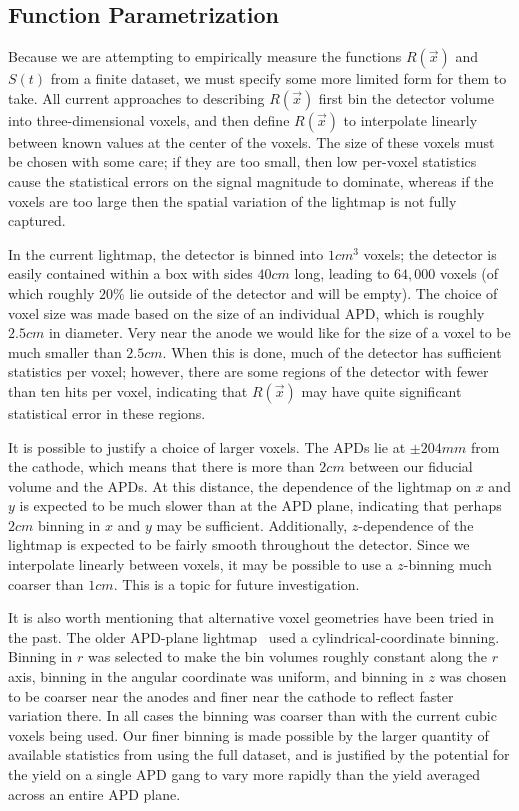 \subsection{Function Parametrization} \label{sec:LightmapFunctionParametrization}

Because we are attempting to empirically measure the functions $R(\vec{x})$ and $S(t)$ from a finite dataset, we must specify some more limited form for them to take.  All current approaches to describing $R(\vec{x})$ first bin the detector volume into three-dimensional voxels, and then define $R(\vec{x})$ to interpolate linearly between known values at the center of the voxels.  The size of these voxels must be chosen with some care; if they are too small, then low per-voxel statistics cause the statistical errors on the signal magnitude to dominate, whereas if the voxels are too large then the spatial variation of the lightmap is not fully captured.

In the current lightmap, the detector is binned into $1 cm^3$ voxels; the detector is easily contained within a box with sides $40 cm$ long, leading to $64,000$ voxels (of which roughly $20\%$ lie outside of the detector and will be empty).  The choice of voxel size was made based on the size of an individual APD, which is roughly $2.5 cm$ in diameter. Very near the anode we would like for the size of a voxel to be much smaller than $2.5 cm$.  When this is done, much of the detector has sufficient statistics per voxel; however, there are some regions of the detector with fewer than ten hits per voxel, indicating that $R(\vec{x})$ may have quite significant statistical error in these regions.

It is possible to justify a choice of larger voxels.  The APDs lie at $\pm 204 mm$ from the cathode, which means that there is more than $2 cm$ between our fiducial volume and the APDs.  At this distance, the dependence of the lightmap on $x$ and $y$ is expected to be much slower than at the APD plane, indicating that perhaps $2 cm$ binning in $x$ and $y$ may be sufficient.  Additionally, $z$-dependence of the lightmap is expected to be fairly smooth throughout the detector. Since we interpolate linearly between voxels, it may be possible to use a $z$-binning much coarser than $1 cm$.  This is a topic for future investigation.

It is also worth mentioning that alternative voxel geometries have been tried in the past.  The older APD-plane lightmap~\cite{ThesisSteve} used a cylindrical-coordinate binning. Binning in $r$ was selected to make the bin volumes roughly constant along the $r$ axis, binning in the angular coordinate was uniform, and binning in $z$ was chosen to be coarser near the anodes and finer near the cathode to reflect faster variation there.  In all cases the binning was coarser than with the current cubic voxels being used. Our finer binning is made possible by the larger quantity of available statistics from using the full dataset, and is justified by the potential for the yield on a single APD gang to vary more rapidly than the yield averaged across an entire APD plane.

